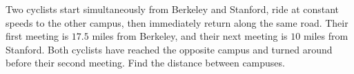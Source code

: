 Two cyclists start simultaneously from Berkeley and Stanford, ride at constant speeds to the other campus, then immediately return along the same road. Their first meeting is $17.5$ miles from Berkeley, and their next meeting is $10$ miles from Stanford. Both cyclists have reached the opposite campus and turned around before their second meeting. Find the distance between campuses.

